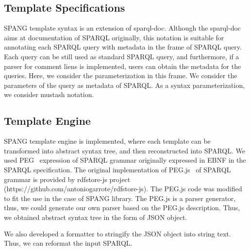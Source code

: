 \documentclass[runningheads]{llncs}
\begin{document}
\subsection{Template Specifications}
SPANG template syntax is an extension of sparql-doc. Although the sparql-doc aims at documentation of SPARQL originally, this notation is suitable for annotating each SPARQL query with metadata in the frame of SPARQL query. Each query can be still used as standard SPARQL query, and furthermore, if a parser for comment liens is implemented, users can obtain the metadata for the queries.
Here, we consider the parameterization in this frame. We consider the parameters of the query as metadata of SPARQL.
As a syntax parameterization, we consider mustash notation.


\subsection{Template Engine}
SPANG template engine is implemented, where each template can be transformed into abstract syntax tree, and then reconstructed into SPARQL. 
We used PEG~\cite{peg} expression of SPARQL grammar originally expressed in EBNF in the SPARQL specification. The original implementation of PEG.js~\cite{pegjs} of SPARQL grammar is provided by rdfstore-js project (https://github.com/antoniogarrote/rdfstore-js).
The PEG.js code was modified to fit the use in the case of SPANG library.
The PEG.js is a parser generator, thus, we could generate our own parser based on the PEG.js description. Thus, we obtained abstract syntax tree in the form of JSON object.

We also developed a formatter to stringify the JSON object into string text. Thus, we can reformat the input SPARQL.
\end{document}
